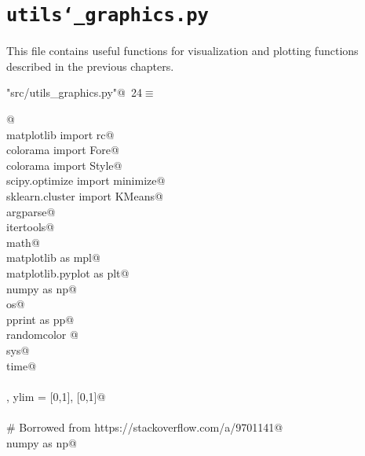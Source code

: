 \documentclass[10pt, english, oneside]{report}
\begin{document}
\begin{appendices}
\begin{flushleft}
\begin{list}{}{\setlength{\itemsep}{-\parsep}\setlength{\itemindent}{-\leftmargin}}
\item{}
\end{list}
\vspace{4ex}
\end{flushleft}
\chapter{\texttt{utils\char`_graphics.py}}

This file contains useful functions for visualization and plotting functions described in the previous chapters.
\begin{flushleft} \small\label{scrap23}\raggedright\small
{} \verb@"src/utils_graphics.py"@\nobreak\ {\footnotesize {24}}$\equiv$
\vspace{-1ex}
\begin{list}{}{} \item
\mbox{}\verb@    @\\
\mbox{}\verb@from matplotlib import rc@\\
\mbox{}\verb@from colorama import Fore@\\
\mbox{}\verb@from colorama import Style@\\
\mbox{}\verb@from scipy.optimize import minimize@\\
\mbox{}\verb@from sklearn.cluster import KMeans@\\
\mbox{}\verb@import argparse@\\
\mbox{}\verb@import itertools@\\
\mbox{}\verb@import math@\\
\mbox{}\verb@import matplotlib as mpl@\\
\mbox{}\verb@import matplotlib.pyplot as plt@\\
\mbox{}\verb@import numpy as np@\\
\mbox{}\verb@import os@\\
\mbox{}\verb@import pprint as pp@\\
\mbox{}\verb@import randomcolor @\\
\mbox{}\verb@import sys@\\
\mbox{}\verb@import time@\\
\mbox{}\verb@@\\
\mbox{}\verb@xlim, ylim = [0,1], [0,1]@\\
\mbox{}\verb@@\\
\mbox{}\verb@# Borrowed from https://stackoverflow.com/a/9701141@\\
\mbox{}\verb@import numpy as np@\\

\end{list}
\end{flushleft}
\end{appendices}
\end{document}
